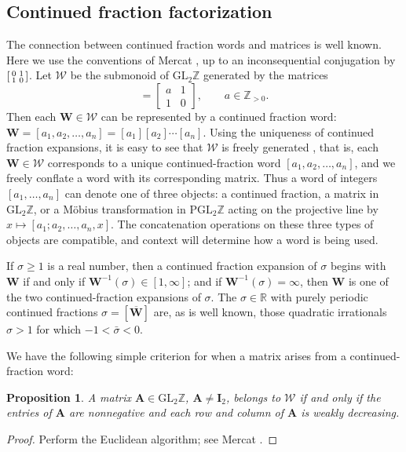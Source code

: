 \documentclass{article}
\numberwithin{equation}{section}
\newtheorem{prop}[thm]{Proposition}
\theoremstyle{definition}
\theoremstyle{remark}
\newcommand{\GL}{\mathrm{GL}}
\newcommand{\PGL}{\mathrm{PGL}}
\newcommand{\RR}{\mathbb{R}}
\newcommand{\ZZ}{\mathbb{Z}}
\newcommand{\W}{\mathcal{W}}
\newcommand{\<}{\left\langle}
\renewcommand{\>}{\right\rangle}
\begin{document}
\subsection{Continued fraction factorization}
The connection between continued fraction words and matrices is well known. Here we use the conventions of Mercat \cite{Mercat13}, up to an inconsequential conjugation by $\begin{bsmallmatrix} 0 & 1 \\ 1 & 0
\end{bsmallmatrix}$.
Let $\W$ be the submonoid of $\GL_2\ZZ$ generated by the matrices
\begin{equation}
  [a] = \begin{bmatrix}
    a & 1 \\ 1 & 0
  \end{bmatrix}, \qquad a \in \ZZ_{>0}.
\end{equation}
Then each $\mathbf{W} \in \W$ can be represented by a continued fraction word: $\mathbf{W} = [a_1, a_2, \ldots, a_n] = [a_1][a_2]\cdots [a_n]$. Using the uniqueness of continued fraction expansions, it is easy to see that $\W$ is freely generated \cite[Remarque 2.6]{Mercat13}, that is, each $\mathbf{W} \in \W$ corresponds to a unique continued-fraction word $[a_1, a_2, \ldots, a_n]$, and we freely conflate a word with its corresponding matrix. Thus a word of integers $[a_1, \ldots, a_n]$ can denote one of three objects: a continued fraction, a matrix in $\GL_2 \ZZ$, or a M\"obius transformation in $\PGL_2 \ZZ$ acting on the projective line by $x \mapsto [a_1; a_2,\ldots, a_n, x]$. The concatenation operations on these three types of objects are compatible, and context will determine how a word is being used.

If $\sigma \geq 1$ is a real number, then a continued fraction expansion of $\sigma$ begins with $\mathbf{W}$ if and only if $\mathbf{W}^{-1}(\sigma) \in [1,\infty]$; and if $\mathbf{W}^{-1}(\sigma) = \infty$, then $\mathbf{W}$ is one of the two continued-fraction expansions of $\sigma$. The $\sigma \in \RR$ with purely periodic continued fractions $\sigma = [\overline{\mathbf{W}}]$ are, as is well known, those quadratic irrationals $\sigma > 1$ for which $-1 < \bar\sigma < 0$.

We have the following simple criterion for when a matrix arises from a continued-fraction word:
\begin{prop}
  A matrix $\mathbf{A} \in \GL_2 \ZZ$, $\mathbf{A} \neq \mathbf{I}_2$, belongs to $\W$ if and only if the entries of $\mathbf{A}$ are nonnegative and each row and column of $\mathbf{A}$ is weakly decreasing.
\end{prop}
\begin{proof}
  Perform the Euclidean algorithm; see Mercat \cite[Proposition 2.3]{Mercat13}.
\end{proof}
\end{document}
